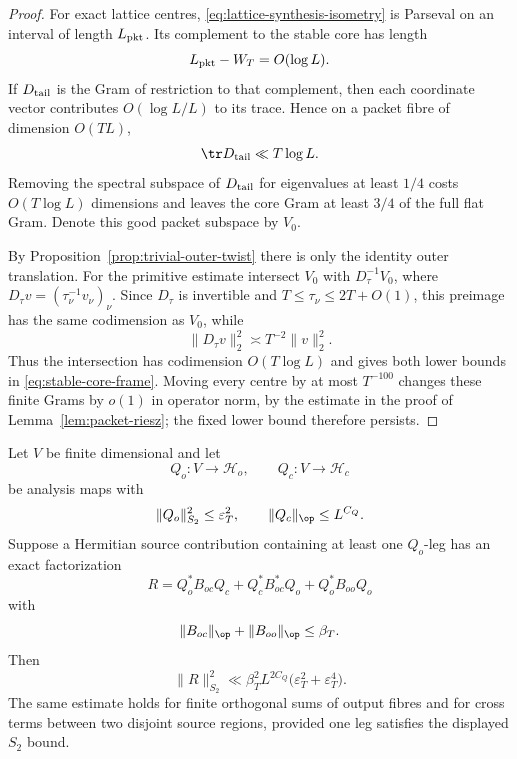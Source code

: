 \begin{proof}
For exact lattice centres, \eqref{eq:lattice-synthesis-isometry} is Parseval on
an interval of length $L_{\rm pkt}$. Its complement to the stable core has
length
\[
L_{\rm pkt}-W_T=O(\log L).
\]
If $D_{\rm tail}$ is the Gram of restriction to that complement, then each
coordinate vector contributes $O(\log L/L)$ to its trace. Hence on a packet
fibre of dimension $O(TL)$,
\[
\tr D_{\rm tail}\ll T\log L.
\]
Removing the spectral subspace of $D_{\rm tail}$ for eigenvalues at least
$1/4$ costs $O(T\log L)$ dimensions and leaves the core Gram at least $3/4$ of
the full flat Gram. Denote this good packet subspace by $V_0$.

By Proposition~\ref{prop:trivial-outer-twist} there is only the identity outer
translation. For the primitive estimate intersect $V_0$ with
$D_\tau^{-1}V_0$, where
$D_\tau v=(\tau_\nu^{-1}v_\nu)_\nu$. Since $D_\tau$ is invertible and
$T\le\tau_\nu\le2T+O(1)$, this preimage has the same codimension as $V_0$, while
\[
\|D_\tau v\|_2^2\asymp T^{-2}\|v\|_2^2.
\]
Thus the intersection has codimension $O(T\log L)$ and gives both lower bounds
in \eqref{eq:stable-core-frame}. Moving every centre by at most $T^{-100}$
changes these finite Grams by $o(1)$ in operator norm, by the estimate in the
proof of Lemma~\ref{lem:packet-riesz}; the fixed lower bound therefore persists.
\end{proof}

\begin{lemma}
\label{lem:one-leaking-leg-HS}
Let $V$ be finite dimensional and let
\[
Q_o:V\to\mathcal H_o,
\qquad
Q_c:V\to\mathcal H_c
\]
be analysis maps with
\[
\|Q_o\|_{S_2}^2\le \varepsilon_T^2,
\qquad
\|Q_c\|_{\op}\le L^{C_Q}.
\]
Suppose a Hermitian source contribution containing at least one $Q_o$-leg has
an exact factorization
\begin{equation}
R=Q_o^*B_{oc}Q_c+Q_c^*B_{oc}^*Q_o+Q_o^*B_{oo}Q_o
\label{eq:one-leaking-leg-factorization}
\end{equation}
with
\[
\|B_{oc}\|_{\op}+\|B_{oo}\|_{\op}\le\beta_T.
\]
Then
\begin{equation}
\boxed{
\|R\|_{S_2}^2
\ll
\beta_T^2L^{2C_Q}
\bigl(\varepsilon_T^2+\varepsilon_T^4\bigr).
}
\label{eq:one-leaking-leg-HS}
\end{equation}
The same estimate holds for finite orthogonal sums of output fibres and for
cross terms between two disjoint source regions, provided one leg satisfies
the displayed $S_2$ bound.
\end{lemma}

